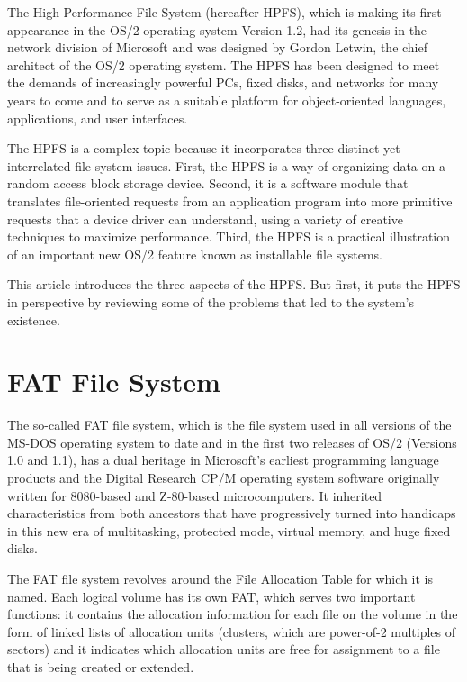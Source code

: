 The High Performance File System (hereafter HPFS), which is making its first
appearance in the OS/2 operating system Version 1.2, had its genesis in the
network division of Microsoft and was designed by Gordon Letwin, the chief
architect of the OS/2 operating system.  The HPFS has been designed to meet
the demands of increasingly powerful PCs, fixed disks, and networks for many
years to come and to serve as a suitable platform for object-oriented
languages, applications, and user interfaces.
 
The HPFS is a complex topic because it incorporates three distinct yet
interrelated file system issues.  First, the HPFS is a way of organizing data
on a random access block storage device. Second, it is a software module that
translates file-oriented requests from an application program into more
primitive requests that a device driver can understand, using a variety of
creative techniques to maximize performance.  Third, the HPFS is a practical
illustration of an important new OS/2 feature known as installable file
systems.
 
This article introduces the three aspects of the HPFS.  But first, it puts
the HPFS in perspective by reviewing some of the problems that led to the
system's existence.
 
\section{\heads FAT File System}
 
The so-called FAT file system, which is the file system used in all versions
of the MS-DOS operating system to date and in the first two releases of
OS/2 (Versions 1.0 and 1.1), has a dual heritage in Microsoft's earliest
programming language products and the Digital Research CP/M operating
system software originally written for 8080-based and Z-80-based
microcomputers.  It inherited characteristics from both ancestors that have
progressively turned into handicaps in this new era of multitasking, protected
mode, virtual memory, and huge fixed disks.
 
The FAT file system revolves around the File Allocation Table for which it is
named.  Each logical volume has its own FAT, which serves two important
functions: it contains the allocation information for each file on the volume
in the form of linked lists of allocation units (clusters, which are
power-of-2 multiples of sectors) and it indicates which allocation units are
free for assignment to a file that is being created or extended.
 
